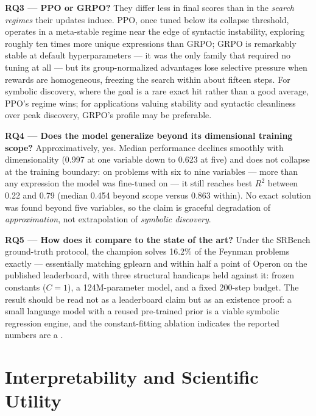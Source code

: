 \textbf{RQ3 --- PPO or GRPO?} They differ less in final scores than in the \emph{search regimes} their updates induce. PPO, once tuned below its collapse threshold, operates in a meta-stable regime near the edge of syntactic instability, exploring roughly ten times more unique expressions than GRPO; GRPO is remarkably stable at default hyperparameters --- it was the only family that required no tuning at all --- but its group-normalized advantages lose selective pressure when rewards are homogeneous, freezing the search within about fifteen steps. For symbolic discovery, where the goal is a rare exact hit rather than a good average, PPO's regime wins; for applications valuing stability and syntactic cleanliness over peak discovery, GRPO's profile may be preferable.

\textbf{RQ4 --- Does the model generalize beyond its dimensional training scope?} Approximatively, yes. Median performance declines smoothly with dimensionality (0.997 at one variable down to 0.623 at five) and does not collapse at the training boundary: on problems with six to nine variables --- more than any expression the model was fine-tuned on --- it still reaches best $R^2$ between 0.22 and 0.79 (median 0.454 beyond scope versus 0.863 within). No exact solution was found beyond five variables, so the claim is graceful degradation of \emph{approximation}, not extrapolation of \emph{symbolic discovery}.

\textbf{RQ5 --- How does it compare to the state of the art?} Under the SRBench ground-truth protocol, the champion solves 16.2\% of the Feynman problems exactly --- essentially matching gplearn and within half a point of Operon on the published leaderboard, with three structural handicaps held against it: frozen constants ($C=1$), a 124M-parameter model, and a fixed 200-step budget. The result should be read not as a leaderboard claim but as an existence proof: a small language model with a reused pre-trained prior is a viable symbolic regression engine, and the constant-fitting ablation indicates the reported numbers are a . %

\section{Interpretability and Scientific Utility}

